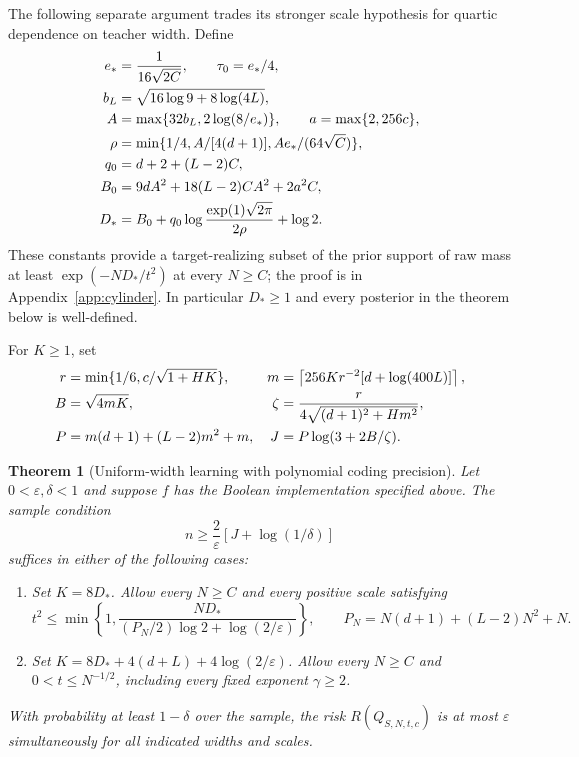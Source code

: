 \documentclass[11pt]{article}
\newtheorem{theorem}{Theorem}
\begin{document}
The following separate argument trades its stronger scale hypothesis for
quartic dependence on teacher width. Define
\begin{align}
 e_*&=\frac1{16\sqrt{2C}},\qquad \tau_0=e_*/4,\notag\\
 b_L&=\sqrt{16\log9+8\log(4L)},\notag\\
 A&=\max\{32b_L,2\log(8/e_*)\},\qquad a=\max\{2,256c\},\notag\\
 \rho&=\min\{1/4,A/[4(d+1)],Ae_*/(64\sqrt C)\},\notag\\
 q_0&=d+2+(L-2)C,\notag\\
 B_0&=9dA^2+18(L-2)CA^2+2a^2C,\notag\\
 D_*&=B_0+q_0\log\frac{\exp(1)\sqrt{2\pi}}{2\rho}+\log2.
 \label{eq:target-cost}
\end{align}
These constants provide a target-realizing subset of the prior support of
raw mass at least $\exp(-ND_*/t^2)$ at every $N\ge C$; the proof is in
Appendix~\ref{app:cylinder}. In particular $D_*\ge1$ and every posterior
in the theorem below is well-defined.

For $K\ge1$, set
\begin{align}
 r&=\min\{1/6,c/\sqrt{1+HK}\}, &
 m&=\left\lceil256Kr^{-2}[d+\log(400L)]\right\rceil,\notag\\
 B&=\sqrt{4mK}, &
 \zeta&=\frac r{4\sqrt{(d+1)^2+Hm^2}},\notag\\
 P&=m(d+1)+(L-2)m^2+m, &
 J&=P\log(3+2B/\zeta).
 \label{eq:budget}
\end{align}

\begin{theorem}[Uniform-width learning with polynomial coding precision]
\label{thm:main}
Let $0<\varepsilon,\delta<1$ and suppose $f$ has the Boolean implementation
specified above. The sample condition
\begin{equation}\label{eq:samples}
 n\ge\frac2\varepsilon\left[J+\log(1/\delta)\right]
\end{equation}
suffices in either of the following cases:
\begin{enumerate}
\item Set $K=8D_*$. Allow every $N\ge C$ and every positive scale satisfying
\[
 t^2\le\min\left\{1,
 \frac{ND_*}{(P_N/2)\log2+\log(2/\varepsilon)}\right\},
 \qquad P_N=N(d+1)+(L-2)N^2+N.
\]
\item Set $K=8D_*+4(d+L)+4\log(2/\varepsilon)$. Allow every $N\ge C$
and $0<t\le N^{-1/2}$, including every fixed exponent $\gamma\ge2$.
\end{enumerate}
With probability at least $1-\delta$ over the sample, the risk
$R(Q_{S,N,t,c})$ is at most $\varepsilon$ simultaneously for all indicated
widths and scales.
\end{theorem}
\end{document}

